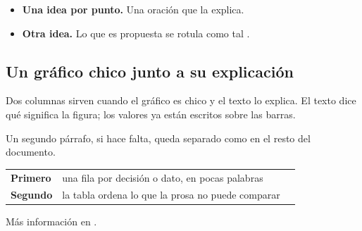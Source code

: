 \documentclass[10pt,a4paper]{article}
\begin{document}
\begin{itemize}
\item \textbf{Una idea por punto.} Una oración que la explica.
\item \textbf{Otra idea.} Lo que es propuesta se rotula como tal .
\end{itemize}


\subsection{Un gráfico chico junto a su explicación}
\noindent\begin{columna}{0.5\linewidth}
\end{columna}\hfill
\begin{columna}{0.46\linewidth}
Dos columnas sirven cuando el gráfico es chico y el texto lo explica. El texto dice qué
significa la figura; los valores ya están escritos sobre las barras.

Un segundo párrafo, si hace falta, queda separado como en el resto del documento.
\end{columna}

\begin{tabularx}{\linewidth}{@{}P{3.2cm}LP{2cm}@{}}
\toprule
{} &  &  \\
\midrule
\textbf{Primero} & una fila por decisión o dato, en pocas palabras &  \\
\textbf{Segundo} & la tabla ordena lo que la prosa no puede comparar &  \\
\bottomrule
\end{tabularx}
\medskip

Más información en .

\begin{glosario}
\end{glosario}
\end{document}
